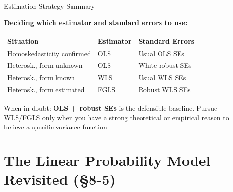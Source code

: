 \documentclass[aspectratio=169, 12pt]{beamer}
\begin{document}
\begin{frame}{Estimation Strategy Summary}

  \begin{highlightbox}
    \textbf{Deciding which estimator and standard errors to use:}
    \begin{center}
      \footnotesize
      \begin{tabular}{lll}
        \toprule
        \textbf{Situation} & \textbf{Estimator} & \textbf{Standard Errors} \\
        \midrule
        Homoskedasticity confirmed & OLS & Usual OLS SEs \\
        Heterosk., form unknown & OLS & White robust SEs \\
        Heterosk., form known & WLS & Usual WLS SEs \\
        Heterosk., form estimated & FGLS & Robust WLS SEs \\
        \bottomrule
      \end{tabular}
    \end{center}
  \end{highlightbox}

  \smallskip

  \begin{keybox}
    When in doubt: \textbf{OLS + robust SEs} is the defensible baseline. Pursue WLS/FGLS only when you have a strong theoretical or empirical reason to believe a specific variance function.
  \end{keybox}

\end{frame}

\section{The Linear Probability Model Revisited (\S8-5)}
\end{document}
